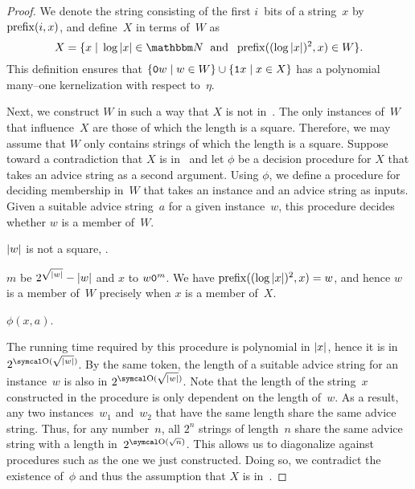 \begin{proof}
  We denote the string consisting of the first $i$~bits of a string~$x$ by $\operatorname{prefix}(i, x)$, and define~$X$ in terms of~$W$ as
  \begin{equation*}
    X \deq \{x \st \log\length{x} \in \bbN \reland \prefix((\log\length{x})^2, x) \in W\}.
  \end{equation*}
  This definition ensures that $\{\textnormal{\texttt{0}}w \;|\; w \in W\} \cup \{\textnormal{\texttt{1}}x \;|\; x \in X\}$ has a polynomial many--one kernelization with respect to~$\eta$.

  Next, we construct $W$ in such a way that $X$ is not in~.
  The only instances of~$W$ that influence~$X$ are those of which the length is a square.
  Therefore, we may assume that $W$ only contains strings of which the length is a square.
  Suppose toward a contradiction that $X$ is in~ and let $\phi$ be a decision procedure for $X$ that takes an advice string as a second argument.
  Using $\phi$, we define a procedure for deciding membership in~$W$ that takes an instance and an advice string as inputs.
  Given a suitable advice string~$a$ for a given instance~$w$, this procedure decides whether $w$ is a member of~$W$.
  \begin{codelisting}
  \item
     $\length{w}$ is not a square,  .
  \item
     $m$ be $2^{\sqrt{\length{w}}} - \length{w}$ and  $x$ to $w\bits{0}^m$.
    We have $\prefix((\log\length{x})^2, x) = w$, and hence $w$ is a member of~$W$ precisely when $x$ is a member of~$X$.
  \item
     $\phi(x, a)$.
  \end{codelisting}
  The running time required by this procedure is polynomial in ${\lvert x\rvert}$, hence it is in $2^{\bigO(\sqrt{\length{w}})}$.
  By the same token, the length of a suitable advice string for an instance~$w$ is also in $2^{\bigO(\sqrt{\length{w}})}$.
  Note that the length of the string~$x$ constructed in the procedure is only dependent on the length of~$w$.
  As a result, any two instances~$w_1$ and~$w_2$ that have the same length share the same advice string.
  Thus, for any number~$n$, all $2^n$ strings of length~$n$ share the same advice string with a length in~$2^{\bigO(\sqrt{n})}$.
  This allows us to diagonalize against procedures such as the one we just constructed.
  Doing so, we contradict the existence of~$\phi$ and thus the assumption that $X$ is in~.


\end{proof}

